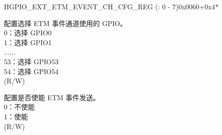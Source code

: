 \begin{register}{H}{GPIO\_EXT\_ETM\_EVENT\_CH\_CFG\_REG (: 0 - 7)}{0x0060+0x4*}\label{regdesc:GPIOSDETMEVENTCHNCFGREG}
%
%
%
%
\regnewline%
\begin{regdesc}\begin{reglist}
\label{fielddesc:GPIOSDETMCH0EVENTSEL}\item [GPIO\_EXT\_ETM\_CH\regindex{n}\_EVENT\_SEL] 配置选择 ETM 事件通道使用的 GPIO。 \\
0：选择 GPIO0 \\
1：选择 GPIO1\\
......\\
53：选择 GPIO53 \\
54：选择 GPIO54 \\ (R/W)
\label{fielddesc:GPIOSDETMCH0EVENTEN}\item [GPIO\_EXT\_ETM\_CH\regindex{n}\_EVENT\_EN]   配置是否使能 ETM 事件发送。\\
0：不使能\\
1：使能\\(R/W)
\end{reglist}\end{regdesc}
\end{register}


